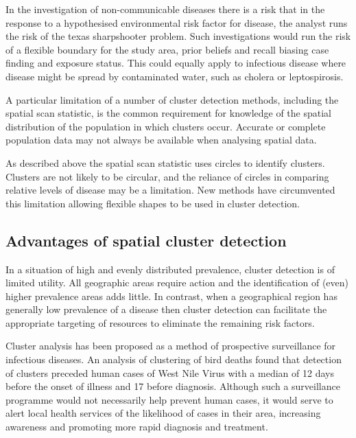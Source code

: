 \documentclass[11pt,a4paper]{article}
\begin{document}
In the investigation of non-communicable diseases there is a risk that in the response to a hypothesised environmental risk factor for disease, the analyst runs the risk of the texas sharpshooter problem. \cite{Rothman1990}\cite{Elliott2004}
Such investigations would run the risk of a flexible boundary for the study area, prior beliefs and recall biasing case finding and exposure status. 
This could equally apply to infectious disease where disease might be spread by contaminated water, such as cholera or leptospirosis. 

A particular limitation of a number of cluster detection methods, including the spatial scan statistic, is the common requirement for knowledge of the spatial distribution of the population in which clusters occur. \cite{Kulldorff1995}
Accurate or complete population data may not always be available when analysing spatial data.

As described above the spatial scan statistic uses circles to identify clusters. 
Clusters are not likely to be circular, and the reliance of circles in comparing relative levels of disease may be a limitation. 
New methods have circumvented this limitation allowing flexible shapes to be used in cluster detection. \cite{Tango2005}


\subsection{Advantages of spatial cluster detection}
In a situation of high and evenly distributed prevalence, cluster detection is of limited utility.
All geographic areas require action and the identification of (even) higher prevalence areas adds little.
In contrast, when a geographical region has generally low prevalence of a disease then cluster detection can facilitate the appropriate targeting of resources to eliminate the remaining risk factors. 

Cluster analysis has been proposed as a method of prospective surveillance for infectious diseases.
An analysis of clustering of bird deaths found that detection of clusters preceded human cases of West Nile Virus with a median of 12 days before the onset of illness and 17 before diagnosis. \cite{Mostashari2003}
Although such a surveillance programme would not necessarily help prevent human cases, it would serve to alert local health services of the likelihood of cases in their area, increasing awareness and promoting more rapid diagnosis and treatment. 



\end{document}
